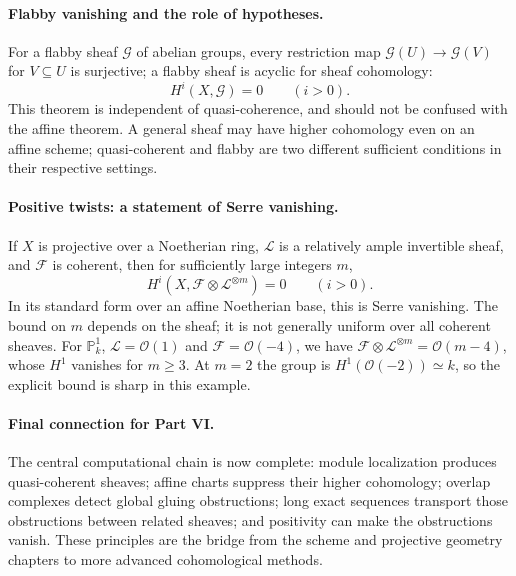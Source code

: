 \paragraph{Flabby vanishing and the role of hypotheses.}
For a flabby sheaf $\mathcal G$ of abelian groups,
every restriction map $\mathcal G(U)\to\mathcal G(V)$
for $V\subseteq U$ is surjective; a flabby sheaf is
acyclic for sheaf cohomology:
\[
H^i(X,\mathcal G)=0\qquad(i>0).
\]
This theorem is independent of quasi-coherence, and
should not be confused with the affine theorem.  A
general sheaf may have higher cohomology even on an
affine scheme; quasi-coherent and flabby are two
different sufficient conditions in their respective
settings.

\paragraph{Positive twists: a statement of Serre vanishing.}
If $X$ is projective over a Noetherian ring, $\mathcal L$
is a relatively ample invertible sheaf, and
$\mathcal F$ is coherent, then for sufficiently large
integers $m$,
\[
 H^i(X,\mathcal F\otimes\mathcal L^{\otimes m})=0
 \qquad (i>0).
\]
In its standard form over an affine Noetherian base,
this is Serre vanishing.  The bound on $m$ depends on
the sheaf; it is not generally uniform over all
coherent sheaves.  For $\mathbb P^1_k$,
$\mathcal L=\mathcal O(1)$ and
$\mathcal F=\mathcal O(-4)$, we have
$\mathcal F\otimes\mathcal L^{\otimes m}
=\mathcal O(m-4)$, whose $H^1$ vanishes for $m\geq3$.
At $m=2$ the group is $H^1(\mathcal O(-2))\simeq k$,
so the explicit bound is sharp in this example.

\paragraph{Final connection for Part VI.}
The central computational chain is now complete:
module localization produces quasi-coherent sheaves;
affine charts suppress their higher cohomology;
overlap complexes detect global gluing obstructions;
long exact sequences transport those obstructions
between related sheaves; and positivity can make the
obstructions vanish.  These principles are the bridge
from the scheme and projective geometry chapters to
more advanced cohomological methods.
